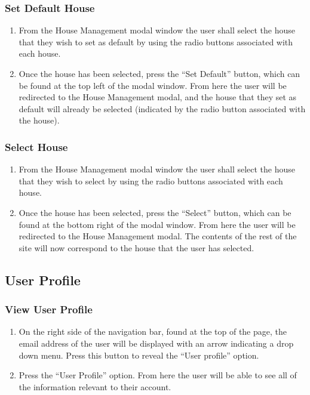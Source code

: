\documentclass[12pt]{article}
\begin{document}
    \subsubsection{Set Default House}
    \begin{enumerate}
        \item From the House Management modal window the user shall select the house that they wish to set as default by using the radio buttons associated with each house.
        \item Once the house has been selected, press the ``Set Default'' button, which can be found at the top left of the modal window. From here the user will be redirected to the House Management modal, and the house that they set as default will already be selected (indicated by the radio button associated with the house).
    \end{enumerate}

    \subsubsection{Select House}
    \begin{enumerate}
        \item From the House Management modal window the user shall select the house that they wish to select by using the radio buttons associated with each house.
        \item Once the house has been selected, press the ``Select'' button, which can be found at the bottom right of the modal window. From here the user will be redirected to the House Management modal. The contents of the rest of the site will now correspond to the house that the user has selected.
    \end{enumerate}

    \subsection{User Profile} %
    \subsubsection{View User Profile}
    \begin{enumerate}
        \item On the right side of the navigation bar, found at the top of the page, the email address of the user will be displayed with an arrow indicating a drop down menu. Press this button to reveal the ``User profile'' option.
        \item Press the ``User Profile'' option. From here the user will be able to see all of the information relevant to their account.
    \end{enumerate}
\end{document}
